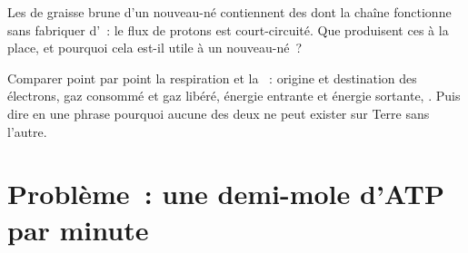 \begin{exercise}[$\star\star\star$]\label{exo:g12:respiration-fermentation:14}
Les  de graisse brune d'un nouveau-né contiennent des
 dont la chaîne fonctionne sans fabriquer d'~: le flux
de protons est court-circuité. Que produisent ces  à la place,
et pourquoi cela est-il utile à un nouveau-né~?
\end{exercise}

\begin{exercise}[$\star\star\star$]\label{exo:g12:respiration-fermentation:15}
Comparer point par point la respiration et la ~: origine
et destination des électrons, gaz consommé et gaz libéré, énergie
entrante et énergie sortante, . Puis dire en une phrase
pourquoi aucune des deux ne peut exister sur Terre sans l'autre.
\end{exercise}

\section{Problème~: une demi-mole d'ATP par minute}

